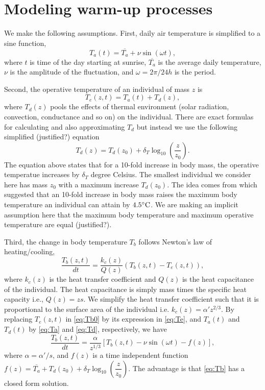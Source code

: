 \section*{Modeling warm-up processes}
We make the following assumptions.
First, daily air temperature is simplified to a sine function,
\begin{equation} \label{eq:Ta}
	T_a(t) = \overline{T_a} + \nu \sin(\omega t),
\end{equation}
where $t$ is time of the day starting at sunrise, $\overline{T_a}$ is the average daily temperature, $\nu$ is the amplitude of the fluctuation, and $\omega = 2 \pi /24 h$ is the period.

Second, the operative temperature of an individual of mass $z$ is 
\begin{equation} \label{eq:Te}
	T_e(z,t) = T_a(t) + T_d(z),
\end{equation}
where $T_d(z)$ pools the effects of thermal environment (solar radiation, convection, conductance and so on) on the individual. 
There are exact formulas for calculating and also approximating $T_d$ \citep[e.g.,][]{Stevenson1985, Angilletta2009} but instead we use the following simplified (justified?) equation
\begin{equation} \label{eq:Td}
 	T_d(z) = T_d(z_0) + \delta_T \log_{10} \left(\frac{z}{z_0} \right).   
\end{equation} 
 The equation above states that for a 10-fold increase in body mass, the operative temperatue increases by $\delta_T$ degree Celsius.
 The smallest individual we consider here has mass $z_0$ with a maximum increase $T_d(z_0)$.
 The idea comes from \citet{Stevenson1985} which suggested that an 10-fold increase in body mass raises the maximum body temperature an individual can attain by $4.5 ^\circ \rm{C}$.
 We are making an implicit assumption here that the maximum body temperature and maximum operative temperature are equal (justified?).

 Third, the change in body temperature $T_b$ follows Newton's law of heating/cooling,
 \begin{equation} \label{eq:Tb0}
 	\frac{T_b(z,t)}{dt} = \frac{k_c(z)}{Q(z)} \left( T_b(z,t) - T_e(z,t)\right),
 \end{equation}
 where $k_c(z)$ is the heat transfer coefficient and $Q(z)$ is the heat capacitance of the individual.
The heat capacitance is simply mass times the specific heat capacity i.e., $Q(z) = z s$.
We simplify the heat transfer coefficient such that it is proportional to the surface area of the individual i.e. $k_c(z) = \alpha' z^{2/3}$.
By replacing $T_e(z,t)$ in \cref{eq:Tb0} by its expression in \cref{eq:Te}, and $T_a(t)$ and $T_d(t)$ by \cref{eq:Ta} and \cref{eq:Td}, respectively, we have
\begin{equation} \label{eq:Tb}
	\frac{T_b(z,t)}{dt} = \frac{\alpha}{z^{1/3}} \left[ T_b(z,t) - \nu \sin(\omega t) - f(z) \right],
\end{equation} 
where $\alpha = \alpha'/s$, and $f(z)$ is a time independent function $f(z) = \overline{T_a} + T_d(z_0) + \delta_T \log_{10} \left( \dfrac{z}{z_0} \right)$.
%
The advantage is that \cref{eq:Tb} has a closed form solution.






